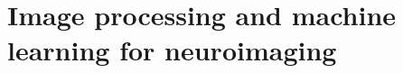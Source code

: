 \chapter{Image processing and machine learning for neuroimaging}
\begin{comment}
This section will discuss:
1. Image processing in neuroimaing
2. ML applications
3. Applicable RP concepts to neuroimaging
\end{comment}